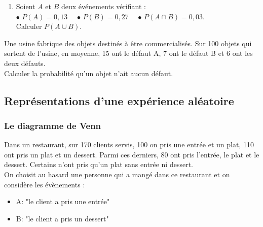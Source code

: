{\begin{Exercice}
\begin{enumerate}[itemsep=1em]
\begin{minipage}[t]{\linewidth}
            Calculer $P(A)$.
           \\\end{minipage}
	\item \begin{minipage}[t]{\linewidth}Soient $A$ et $B$ deux événements vérifiant :  \\
           $\bullet$  $P(A)=0{,}13$ \,\,\,\, $\bullet$  $P(B)=0{,}27$ \,\,\,\,
           $\bullet$  $P(A\cap B)=0{,}03$.\\
            Calculer $P(A\cup B)$.
           \\\end{minipage}
\end{enumerate}
\end{Exercice}

\begin{Exercice}
Une usine fabrique des objets destinés à être commercialisés.
Sur 100 objets qui sortent de l'usine, en moyenne, 15 ont le défaut A, 7 ont le défaut B et 6 ont les deux défauts.\\
Calculer la probabilité qu'un objet n'ait aucun défaut.
\end{Exercice}

\newpage

\subsection*{Représentations d'une expérience aléatoire}

\subsubsection*{Le diagramme de Venn}

\begin{Exercice}
Dans un restaurant, sur 170 clients servis, 100 on pris une entrée et un plat, 110 ont pris un plat et un dessert. Parmi ces derniers, 80 ont pris l'entrée, le plat et le dessert. Certains n'ont pris qu'un plat sans entrée ni dessert.\\
On choisit au hasard une personne qui a mangé dans ce restaurant et on considère les évènements :

\begin{itemize}[label=\textcolor{Couleur6}{$\bullet$}]
\item A:  "le client a pris une entrée"
\item B:  "le client a pris un dessert"
\end{itemize} 


\end{Exercice}}
